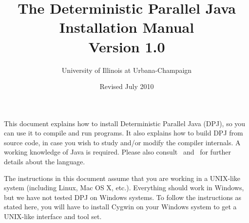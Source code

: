 \documentclass[10pt]{article}
\title{\bfseries{The Deterministic Parallel Java Installation Manual \\
Version 1.0}}
\author{University of Illinois at Urbana-Champaign}
\date{Revised July 2010}
\begin{document}
\maketitle

\begin{sloppypar}
This document explains how to install Deterministic Parallel Java
(DPJ), so you can use it to compile and run programs.  It also
explains how to build DPJ from source code, in case you wish to study
and/or modify the compiler internals.  A working knowledge of Java is
required. Please also consult \tutorial\ and \ for
further details about the language.

The instructions in this document assume that you are working in a
UNIX-like system (including Linux, Mac OS X, etc.).  Everything should
work in Windows, but we have not tested DPJ on Windows systems.  To
follow the instructions as stated here, you will have to install
Cygwin on your Windows system to get a UNIX-like interface and tool
set.

\tableofcontents{}

\pagebreak




\end{sloppypar}
\end{document}
